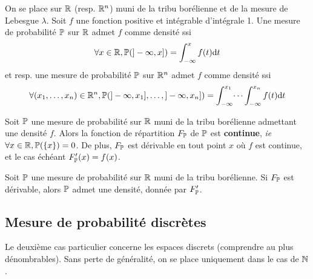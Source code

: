 \documentclass[../integ-proba.tex]{subfiles}
\begin{document}
    \begin{thm}
        \label{thm:cns_densite}
        On se place sur $\mathbb{R}$ (resp. $\mathbb{R}^n$) muni de la tribu borélienne et de la mesure de Lebesgue $\lambda$.
        Soit $f$ une fonction positive et intégrable d'intégrale 1.
        Une mesure de probabilité $\mathbb{P}$ sur $\mathbb{R}$ admet $f$ comme densité ssi
        \begin{displaymath}
            \forall x \in \mathbb{R}, \mathbb{P}(]-\infty, x]) = \int_{- \infty}^x f(t)\textnormal{d}t
        \end{displaymath}
        et resp. une mesure de probabilité $\mathbb{P}$ sur $\mathbb{R}^n$ admet $f$ comme densité ssi
        \begin{displaymath}
            \forall (x_1,\ldots,x_n) \in \mathbb{R}^n, \mathbb{P}(]-\infty, x_1], \ldots, ]-\infty, x_n]) = \int_{- \infty}^{x_1} \dots \int_{- \infty}^{x_n} f(t) \textnormal{d}t
        \end{displaymath}
    \end{thm}

    \begin{prop}
        \label{prop:continuite_fdrep_densite}
        Soit $\mathbb{P}$ une mesure de probabilité sur $\mathbb{R}$ muni de la tribu borélienne admettant une densité $f$.
        Alors la fonction de répartition $F_{\mathbb{P}}$ de $\mathbb{P}$ est \textbf{continue}, \textit{ie} $\forall x \in \mathbb{R}, \mathbb{P}(\left\{ x \right\}) = 0$.
        De plus, $F_{\mathbb{P}}$ est dérivable en tout point $x$ où $f$ est continue, et le cas échéant $F'_{\mathbb{P}}(x) = f(x)$.
    \end{prop}

    \begin{prop}
        Soit $\mathbb{P}$ une mesure de probabilité sur $\mathbb{R}$ muni de la tribu borélienne.
        Si $F_{\mathbb{P}}$ est dérivable, alors $\mathbb{P}$ admet une densité, donnée par $F'_{\mathbb{P}}$.
    \end{prop}



    \subsection{Mesure de probabilité discrètes}
    Le deuxième cas particulier concerne les espaces discrets (comprendre au plus dénombrables).
    Sans perte de généralité, on se place uniquement dans le cas de $\mathbb{N}$.
\end{document}

